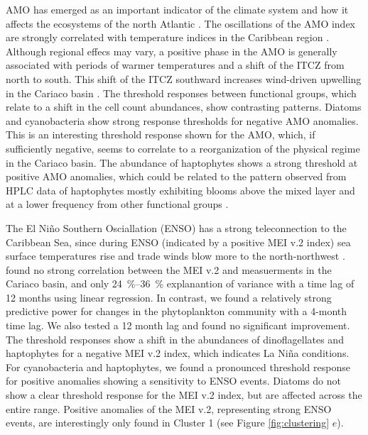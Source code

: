 \documentclass[draft]{agujournal2019}
\begin{document}
AMO has emerged as an important indicator of the climate system and how it affects the ecosystems of the north Atlantic \cite{nye_ecosystem_2014}. The oscillations of the AMO index are strongly correlated with temperature indices in the Caribbean region \cite{stephenson_changes_2014}. Although regional effecs may vary, a positive phase in the AMO is generally associated with periods of warmer temperatures and a shift of the ITCZ from north to south. This shift of the ITCZ southward increases wind-driven upwelling in the Cariaco basin \cite{taylor_ecosystem_2012}. The threshold responses between functional groups, which relate to a shift in the cell count abundances, show contrasting patterns. Diatoms and cyanobacteria show strong response thresholds for negative AMO anomalies. This is an interesting threshold response shown for the AMO, which, if sufficiently negative, seems to correlate to a reorganization of the physical regime in the Cariaco basin. The abundance of haptophytes shows a strong threshold at positive AMO anomalies, which could be related to the pattern observed from HPLC data of haptophytes mostly exhibiting blooms above the mixed layer and at a lower frequency from other functional groups \cite{pinckney_phytoplankton_2015}.

The El Niño Southern Osciallation (ENSO) has a strong teleconnection to the Caribbean Sea, since during ENSO (indicated by a positive MEI v.2 index) sea surface temperatures rise and trade winds blow more to the north-northwest \cite{enfield_tropical_1997}.  found no strong correlation between the MEI v.2 and measuerments in the Cariaco basin, and only \qtyrange{24}{36}{\%} explanantion of variance with a time lag of 12 months using linear regression. In contrast, we found a relatively strong predictive power for changes in the phytoplankton community with a 4-month time lag. We also tested a 12 month lag and found no significant improvement.
The threshold responses show a shift in the abundances of dinoflagellates and haptophytes for a negative MEI v.2 index, which indicates La Niña conditions. For cyanobacteria and haptophytes, we found a pronounced threshold response for positive anomalies showing a sensitivity to ENSO events. Diatoms do not show a clear threshold response for the MEI v.2 index, but are affected across the entire range. Positive anomalies of the MEI v.2, representing strong ENSO events, are interestingly only found in Cluster 1 (see Figure \ref{fig:clustering} $e$). 
\end{document}
